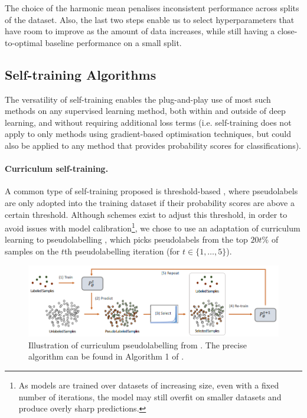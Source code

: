 \documentclass{article}
\begin{document}
The choice of the harmonic mean penalises inconsistent performance across splits of the
dataset.
Also, the last two steps enable us to select hyperparameters that have room to improve
as the amount of data increases, while still having a close-to-optimal baseline
performance on a small split.

\subsection{Self-training Algorithms}

The versatility of self-training enables the plug-and-play use of most such methods on
any supervised learning method, both within and outside of deep learning, and without
requiring additional loss terms (i.e. self-training does not apply to only methods
using gradient-based optimisation techniques, but could also be applied to any method
that provides probability scores for classifications).

\paragraph{Curriculum self-training.}
A common type of self-training proposed is threshold-based \cite{amini2023selftraining},
where pseudolabels are only adopted into the training dataset if their probability
scores are above a certain threshold.
Although schemes exist to adjust this threshold, in order to avoid issues with model
calibration\footnote{%
  As models are trained over datasets of increasing size, even with a fixed number of
  iterations, the model may still overfit on smaller datasets and produce overly sharp
  predictions.
}, we chose to use an adaptation of curriculum learning to pseudolabelling
\cite{cascante-bonilla2020curriculum}, which picks pseudolabels from the top $20t\%$ of
samples on the $t$th pseudolabelling iteration (for $t \in \{1, \ldots, 5\}$).

\begin{figure}[htbp]
  \centering
  \includegraphics[width=\columnwidth]{curriculum_pseudolabelling.png}
  \caption{
    Illustration of curriculum pseudolabelling from
    \cite{cascante-bonilla2020curriculum}.
    The precise algorithm can be found in Algorithm 1 of
    \cite{cascante-bonilla2020curriculum}.
  }
  \label{fig:curr-pl}
\end{figure}
\end{document}
